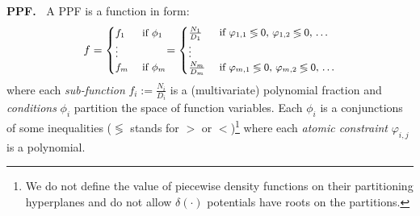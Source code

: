 \documentclass[]{article}
\newcommand{\case}[2]{#2 &\text{ if } #1}%
\begin{document}
{\bf PPF.\ } A PPF is a function in form:
\begin{equation}\footnotesize
\label{e:ppf}
f =
  \begin{cases}
  \case{\phi_1}{f_1}\\
\vdots\\
  \case{\phi_m}{f_m}    
  \end{cases}
\!\!=
  \begin{cases}
  \case{\varphi_{1,1} \lessgtr 0,\, \varphi_{1,2} \lessgtr 0,\, \ldots}{\frac{N_1}{D_1}} \\
\vdots\\
   \case{\varphi_{m,1} \lessgtr 0,\, \varphi_{m,2} \lessgtr 0,\, \ldots}{\frac{N_m}{D_m}}    
  \end{cases}
\end{equation}
where each \emph{sub-function} $f_i := \frac{N_i}{D_i}$ is a (multivariate) polynomial fraction and
\emph{conditions} $\phi_i$ partition the space of function variables. 
Each $\phi_i$ is a conjunctions of some inequalities ($\lessgtr$ stands for  
$>$ or $<$)\footnote{
We do not define the value of piecewise density functions on their partitioning hyperplanes and do not allow $\delta(\cdot)$ potentials have roots on the partitions. 
} 
where each \emph{atomic constraint} $\varphi_{i,j}$ is a polynomial.

\end{document}
